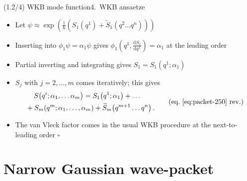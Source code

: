 \documentclass[mathserif]{beamer}
\newcommand{\rbr}[1]{{\left(#1\right)}}
\newcommand{\rfun}[2]{#1\mathopen{}\left(#2\right)\mathclose{}}
\newcommand{\frde}[2]{{\frac{\dif{#1}}{\dif{#2}}}}
\newcommand{\dif}{\mathrm{d}}
\newcommand\mi{\mathrm{i}} %
\begin{document}
\begin{frame}{(1.2/4) WKB mode function}{4.\ WKB ansaetze}
\begin{itemize}
    \item Let $\psi \approx \rfun{\exp}{\frac{\mi}{\hslash} \rbr{\rfun{S_1}{q^1} + \rfun{\widetilde{S}_1}{q^2 \ldots q^n}}}$

    \item Inserting into $\phi_1 \psi = \alpha_1 \psi$ gives $\rfun{\phi_1}{q^1, \frde{S_1}{q^1}} = \alpha_1$ at the leading order

    \item Partial inverting and integrating gives $S_1 = \rfun{S_1}{q^1; \alpha_1}$

    \item $S_j$ with $j = 2, \ldots, m$ comes iteratively; this gives
    \begin{align}
    \begin{split}
    &\quad\,\rfun{S}{q^i; \alpha_1, \ldots \alpha_m} = \rfun{S_1}{q^1; \alpha_1} + %
    \ldots
    \\
    &+ \rfun{S_m}{q^m; \alpha_1, \ldots, \alpha_m}
    +
    \rfun{\widetilde{S}_{m}}{q^{m+1}\ldots q^n}\,. %
\end{split}
\tag{eq.\ \eqref{eq:packet-250} rev.}
\end{align}

    \item
    The van Vleck factor comes in the usual WKB procedure at the next-to-leading order \hfill $\square$

\end{itemize}

\end{frame}

\section{Narrow Gaussian wave-packet}

\end{document}
